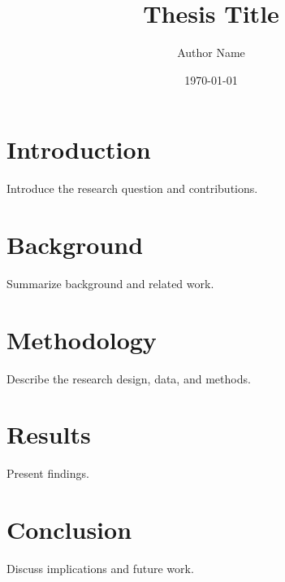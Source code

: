 \documentclass[12pt]{report}
\title{Thesis Title}
\author{Author Name}
\date{\today}
\begin{document}
\maketitle
\tableofcontents

\chapter{Introduction}
Introduce the research question and contributions.

\chapter{Background}
Summarize background and related work.

\chapter{Methodology}
Describe the research design, data, and methods.

\chapter{Results}
Present findings.

\chapter{Conclusion}
Discuss implications and future work.



\end{document}
